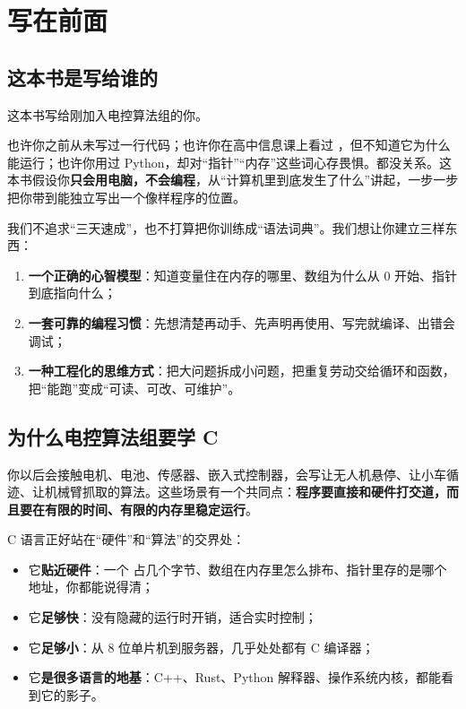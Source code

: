 \chapter*{写在前面}

\section*{这本书是写给谁的}

这本书写给刚加入电控算法组的你。

也许你之前从未写过一行代码；也许你在高中信息课上看过 ，但不知道它为什么能运行；也许你用过 Python，却对“指针”“内存”这些词心存畏惧。都没关系。这本书假设你\textbf{只会用电脑，不会编程}，从“计算机里到底发生了什么”讲起，一步一步把你带到能独立写出一个像样程序的位置。

我们不追求“三天速成”，也不打算把你训练成“语法词典”。我们想让你建立三样东西：

\begin{enumerate}
  \item \textbf{一个正确的心智模型}：知道变量住在内存的哪里、数组为什么从 0 开始、指针到底指向什么；
  \item \textbf{一套可靠的编程习惯}：先想清楚再动手、先声明再使用、写完就编译、出错会调试；
  \item \textbf{一种工程化的思维方式}：把大问题拆成小问题，把重复劳动交给循环和函数，把“能跑”变成“可读、可改、可维护”。
\end{enumerate}

\section*{为什么电控算法组要学 C}

你以后会接触电机、电池、传感器、嵌入式控制器，会写让无人机悬停、让小车循迹、让机械臂抓取的算法。这些场景有一个共同点：\textbf{程序要直接和硬件打交道，而且要在有限的时间、有限的内存里稳定运行}。

C 语言正好站在“硬件”和“算法”的交界处：

\begin{itemize}
  \item 它\textbf{贴近硬件}：一个  占几个字节、数组在内存里怎么排布、指针里存的是哪个地址，你都能说得清；
  \item 它\textbf{足够快}：没有隐藏的运行时开销，适合实时控制；
  \item 它\textbf{足够小}：从 8 位单片机到服务器，几乎处处都有 C 编译器；
  \item 它\textbf{是很多语言的地基}：C++、Rust、Python 解释器、操作系统内核，都能看到它的影子。
\end{itemize}

